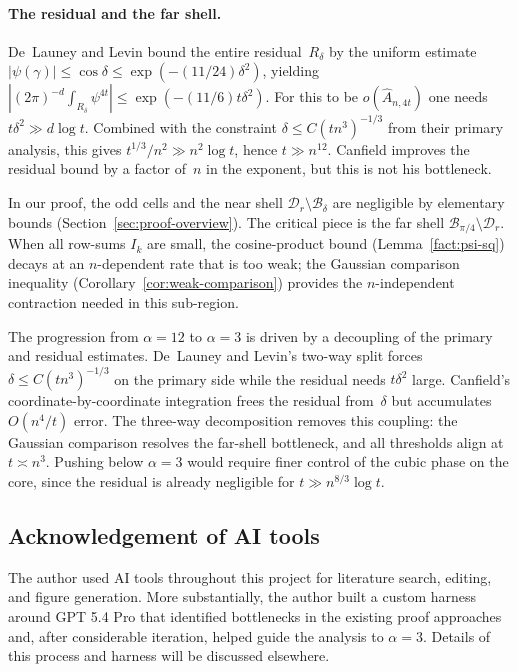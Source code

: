 \documentclass[11pt]{article}
\theoremstyle{definition}
\newcommand{\Bbox}{\mathcal{B}}
\newcommand{\Dd}{\mathcal{D}}
\newcommand{\Ahat}{\hat A_{n,4t}}
\begin{document}
\paragraph{The residual and the far shell.}
De~Launey and Levin bound the entire residual~\(R_\delta\) by the uniform estimate \(|\psi(\gamma)|\le\cos\delta\le \exp(-(11/24)\delta^2)\), yielding \(|(2\pi)^{-d}\!\int_{R_\delta}\!\psi^{4t}|\le \exp(-(11/6)t\delta^2)\). For this to be \(o(\Ahat)\) one needs \(t\delta^2\gg d\log t\). Combined with the constraint \(\delta\le C(tn^3)^{-1/3}\) from their primary analysis, this gives \(t^{1/3}/n^2\gg n^2\log t\), hence \(t\gg n^{12}\). Canfield improves the residual bound by a factor of~\(n\) in the exponent, but this is not his bottleneck.

In our proof, the odd cells and the near shell \(\Dd_r\setminus\Bbox_\delta\) are negligible by elementary bounds (Section~\ref{sec:proof-overview}). The critical piece is the far shell \(\Bbox_{\pi/4}\setminus\Dd_r\). When all row-sums \(I_k\) are small, the cosine-product bound (Lemma~\ref{fact:psi-sq}) decays at an \(n\)-dependent rate that is too weak; the Gaussian comparison inequality (Corollary~\ref{cor:weak-comparison}) provides the \(n\)-independent contraction needed in this sub-region.

\medskip

The progression from \(\alpha=12\) to \(\alpha=3\) is driven by a decoupling of the primary and residual estimates. De~Launey and Levin's two-way split forces \(\delta\le C(tn^3)^{-1/3}\) on the primary side while the residual needs \(t\delta^2\) large. Canfield's coordinate-by-coordinate integration frees the residual from~\(\delta\) but accumulates \(O(n^4/t)\) error. The three-way decomposition removes this coupling: the Gaussian comparison resolves the far-shell bottleneck, and all thresholds align at \(t\asymp n^3\). Pushing below \(\alpha=3\) would require finer control of the cubic phase on the core, since the residual is already negligible for \(t\gg n^{8/3}\log t\).

\subsection*{Acknowledgement of AI tools}

The author used AI tools throughout this project for literature search, editing, and figure generation. More substantially, the author built a custom harness around GPT 5.4 Pro that identified bottlenecks in the existing proof approaches and, after considerable iteration, helped guide the analysis to \(\alpha=3\). Details of this process and harness will be discussed elsewhere.
\end{document}
